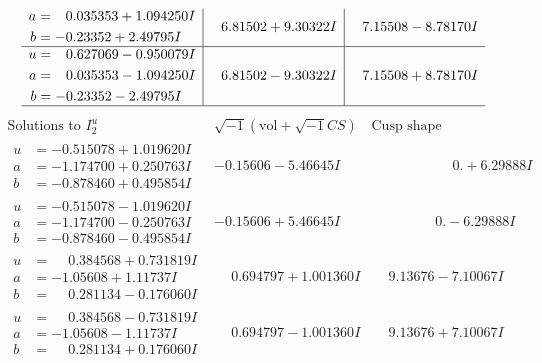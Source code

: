 \documentclass[1p]{elsarticle_modified}
\theoremstyle{definition}
\newcommand{\I}{\sqrt{-1}}
\begin{document}
$$\begin{array}{c|c|c}
\begin{aligned}
a &= \phantom{-}0.035353 + 1.094250 I \\
b &= -0.23352 + 2.49795 I\end{aligned}
 & \phantom{-}6.81502 + 9.30322 I & \phantom{-}7.15508 - 8.78170 I \\ \hline\begin{aligned}
u &= \phantom{-}0.627069 - 0.950079 I \\
a &= \phantom{-}0.035353 - 1.094250 I \\
b &= -0.23352 - 2.49795 I\end{aligned}
 & \phantom{-}6.81502 - 9.30322 I & \phantom{-}7.15508 + 8.78170 I\\
 \hline 
 \end{array}$$\newpage$$\begin{array}{c|c|c}  
\text{Solutions to }I^u_{2}& \I (\text{vol} + \sqrt{-1}CS) & \text{Cusp shape}\\
 \hline 
\begin{aligned}
u &= -0.515078 + 1.019620 I \\
a &= -1.174700 + 0.250763 I \\
b &= -0.878460 + 0.495854 I\end{aligned}
 & -0.15606 - 5.46645 I & \phantom{-0.000000 -}0. + 6.29888 I \\ \hline\begin{aligned}
u &= -0.515078 - 1.019620 I \\
a &= -1.174700 - 0.250763 I \\
b &= -0.878460 - 0.495854 I\end{aligned}
 & -0.15606 + 5.46645 I & \phantom{-0.000000 } 0. - 6.29888 I \\ \hline\begin{aligned}
u &= \phantom{-}0.384568 + 0.731819 I \\
a &= -1.05608 + 1.11737 I \\
b &= \phantom{-}0.281134 - 0.176060 I\end{aligned}
 & \phantom{-}0.694797 + 1.001360 I & \phantom{-}9.13676 - 7.10067 I \\ \hline\begin{aligned}
u &= \phantom{-}0.384568 - 0.731819 I \\
a &= -1.05608 - 1.11737 I \\
b &= \phantom{-}0.281134 + 0.176060 I\end{aligned}
 & \phantom{-}0.694797 - 1.001360 I & \phantom{-}9.13676 + 7.10067 I \\ \hline\begin{aligned}

\end{aligned}
\end{array}$$
\end{document}
